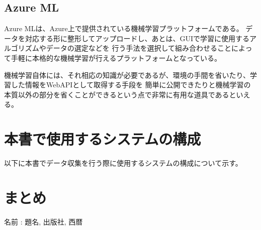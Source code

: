 \documentclass[10pt,a4j,twocolumn]{jarticle}
\begin{document}
	\subsection{Azure ML}
	Azure MLは、Azure上で提供されている機械学習プラットフォームである。
	データを対応する形に整形してアップロードし、あとは、GUIで学習に使用するアルゴリズムやデータの選定などを
	行う手法を選択して組み合わせることによって手軽に本格的な機械学習が行えるプラットフォームとなっている。

	機械学習自体には、それ相応の知識が必要であるが、環境の手間を省いたり、学習した情報をWebAPIとして取得する手段を
	簡単に公開できたりと機械学習の本質以外の部分を省くことができるという点で非常に有用な道具であるといえる。

	\section{本書で使用するシステムの構成}
	以下に本書でデータ収集を行う際に使用するシステムの構成について示す。


	\section{まとめ}

	\begin{thebibliography}{9}
		 名前 : 題名, 出版社, 西暦
	\end{thebibliography}
\end{document}
